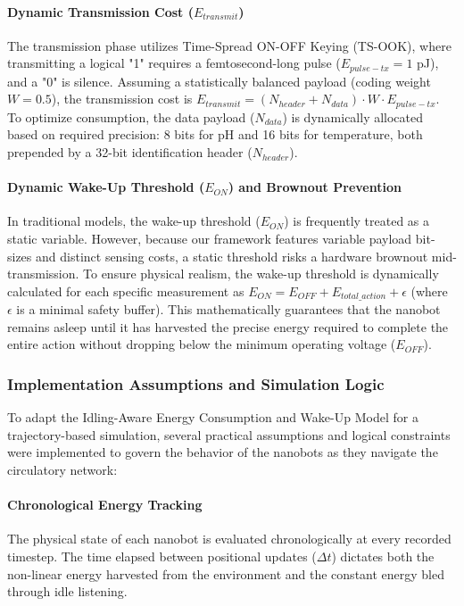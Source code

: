 \documentclass[sigconf]{acmart}
\begin{document}
\paragraph{Dynamic Transmission Cost ($E_{transmit}$)} The transmission phase utilizes Time-Spread ON-OFF Keying (TS-OOK), where transmitting a logical "1" requires a femtosecond-long pulse ($E_{pulse-tx} = 1$ pJ), and a "0" is silence. Assuming a statistically balanced payload (coding weight $W = 0.5$), the transmission cost is $E_{transmit} = (N_{header} + N_{data}) \cdot W \cdot E_{pulse-tx}$. To optimize consumption, the data payload ($N_{data}$) is dynamically allocated based on required precision: 8 bits for pH and 16 bits for temperature, both prepended by a 32-bit identification header ($N_{header}$).

\paragraph{Dynamic Wake-Up Threshold ($E_{ON}$) and Brownout Prevention} In traditional models, the wake-up threshold ($E_{ON}$) is frequently treated as a static variable. However, because our framework features variable payload bit-sizes and distinct sensing costs, a static threshold risks a hardware brownout mid-transmission. To ensure physical realism, the wake-up threshold is dynamically calculated for each specific measurement as $E_{ON} = E_{OFF} + E_{total\_action} + \epsilon$ (where $\epsilon$ is a minimal safety buffer). This mathematically guarantees that the nanobot remains asleep until it has harvested the precise energy required to complete the entire action without dropping below the minimum operating voltage ($E_{OFF}$).

\subsubsection{Implementation Assumptions and Simulation Logic}
To adapt the Idling-Aware Energy Consumption and Wake-Up Model for a trajectory-based simulation, several practical assumptions and logical constraints were implemented to govern the behavior of the nanobots as they navigate the circulatory network:

\paragraph{Chronological Energy Tracking} The physical state of each nanobot is evaluated chronologically at every recorded timestep. The time elapsed between positional updates ($\Delta t$) dictates both the non-linear energy harvested from the environment and the constant energy bled through idle listening.
\end{document}
